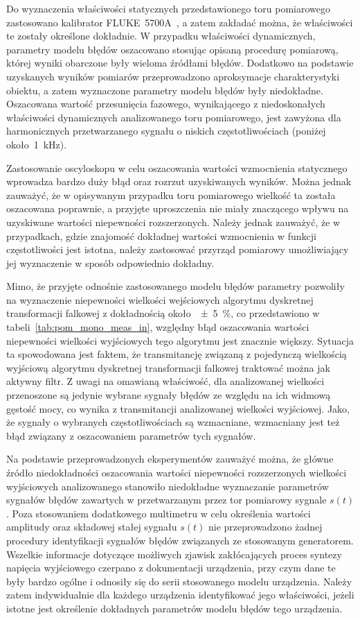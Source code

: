 Do wyznaczenia właściwości statycznych przedstawionego toru pomiarowego zastosowano kalibrator FLUKE~5700A~\cite{fluke_manual}, a zatem zakładać można, że właściwości te zostały określone dokładnie. W przypadku właściwości dynamicznych, parametry modelu błędów oszacowano stosując opisaną procedurę pomiarową, której wyniki obarczone były wieloma źródłami błędów. Dodatkowo na podstawie uzyskanych wyników pomiarów przeprowadzono aproksymacje charakterystyki obiektu, a zatem wyznaczone parametry modelu błędów były niedokładne. Oszacowana wartość przesunięcia fazowego, wynikającego z niedoskonałych właściwości dynamicznych analizowanego toru pomiarowego, jest zawyżona dla harmonicznych przetwarzanego sygnału o niskich częstotliwościach (poniżej około~\qty{1}{kHz}).

Zastosowanie oscyloskopu w celu oszacowania wartości wzmocnienia statycznego wprowadza bardzo duży błąd oraz rozrzut uzyskiwanych wyników. Można jednak zauważyć, że w opisywanym przypadku toru pomiarowego wielkość ta została oszacowana poprawnie, a przyjęte uproszczenia nie miały znaczącego wpływu na uzyskiwane wartości niepewności rozszerzonych. Należy jednak zauważyć, że w przypadkach, gdzie znajomość dokładnej wartości wzmocnienia w funkcji częstotliwości jest istotna, należy zastosować przyrząd pomiarowy umożliwiający jej wyznaczenie w sposób odpowiednio dokładny.

Mimo, że przyjęte odnośnie zastosowanego modelu błędów parametry pozwoliły na wyznaczenie niepewności wielkości wejściowych algorytmu dyskretnej transformacji falkowej z dokładnością około~\qty{\pm 5}{\percent}, co przedstawiono w tabeli~\ref{tab:pom_mono_meas_in}, względny błąd oszacowania wartości niepewności wielkości wyjściowych tego algorytmu jest znacznie większy. Sytuacja ta spowodowana jest faktem, że transmitancję związaną z pojedynczą wielkością wyjściową algorytmu dyskretnej transformacji falkowej traktować można jak aktywny filtr. Z uwagi na omawianą właściwość, dla analizowanej wielkości przenoszone są jedynie wybrane sygnały błędów ze względu na ich widmową gęstość mocy, co wynika z transmitancji analizowanej wielkości wyjściowej. Jako, że sygnały o wybranych częstotliwościach są wzmacniane, wzmacniany jest też błąd związany z oszacowaniem parametrów tych sygnałów.

Na podstawie przeprowadzonych eksperymentów zauważyć można, że główne źródło niedokładności oszacowania wartości niepewności rozszerzonych wielkości wyjściowych analizowanego stanowiło niedokładne wyznaczanie parametrów sygnałów błędów zawartych w przetwarzanym przez tor pomiarowy sygnale $s(t)$. Poza stosowaniem dodatkowego multimetru w celu określenia wartości amplitudy oraz składowej stałej sygnału $s(t)$ nie przeprowadzono żadnej procedury identyfikacji sygnałów błędów związanych ze stosowanym generatorem. Wszelkie informacje dotyczące możliwych zjawisk zakłócających proces syntezy napięcia wyjściowego czerpano z dokumentacji urządzenia, przy czym dane te były bardzo ogólne i odnosiły się do serii stosowanego modelu urządzenia. Należy zatem indywidualnie dla każdego urządzenia identyfikować jego właściwości, jeżeli istotne jest określenie dokładnych parametrów modelu błędów tego urządzenia.

